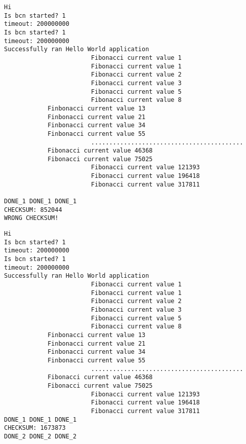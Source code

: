 \begin{lstlisting}[style=preformatted, caption={SDE output - before correction}]
Hi
Is bcn started? 1
timeout: 200000000
Is bcn started? 1
timeout: 200000000
Successfully ran Hello World application
						Fibonacci current value 1
						Fibonacci current value 1
						Fibonacci current value 2
						Fibonacci current value 3
						Fibonacci current value 5
						Fibonacci current value 8
            Finbonacci current value 13
            Finbonacci current value 21
            Finbonacci current value 34
            Finbonacci current value 55
						..........................................
            Fibonacci current value 46368
            Fibonacci current value 75025
						Fibonacci current value 121393
						Fibonacci current value 196418
						Fibonacci current value 317811

DONE_1 DONE_1 DONE_1
CHECKSUM: 852044
WRONG CHECKSUM!
\end{lstlisting}
\newpage
\begin{lstlisting}[style=preformatted, caption={SDE output - after correction}]
Hi
Is bcn started? 1
timeout: 200000000
Is bcn started? 1
timeout: 200000000
Successfully ran Hello World application
						Fibonacci current value 1
						Fibonacci current value 1
						Fibonacci current value 2
						Fibonacci current value 3
						Fibonacci current value 5
						Fibonacci current value 8
            Finbonacci current value 13
            Finbonacci current value 21
            Finbonacci current value 34
            Finbonacci current value 55
						..........................................
            Fibonacci current value 46368
            Fibonacci current value 75025
						Fibonacci current value 121393
						Fibonacci current value 196418
						Fibonacci current value 317811
DONE_1 DONE_1 DONE_1
CHECKSUM: 1673873
DONE_2 DONE_2 DONE_2
\end{lstlisting}





